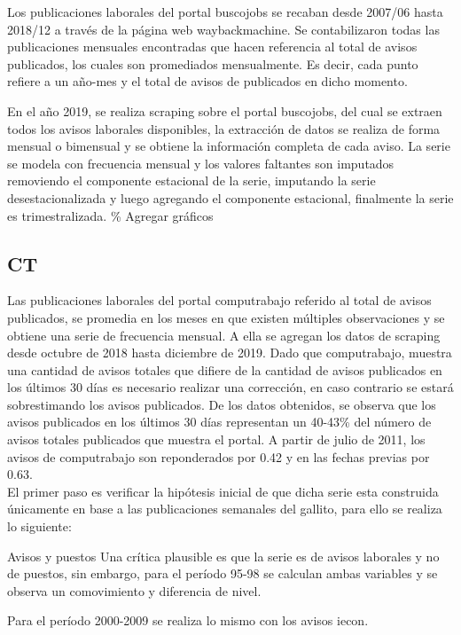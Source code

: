 \documentclass[12pt,twoside]{reedthesis}
\begin{document}
Los publicaciones laborales del portal buscojobs se recaban desde 2007/06 hasta 2018/12 a través de la página web waybackmachine. Se contabilizaron todas las publicaciones mensuales encontradas que hacen referencia al total de avisos publicados, los cuales son promediados mensualmente. Es decir, cada punto refiere a un año-mes y el total de avisos de publicados en dicho momento.

En el año 2019, se realiza scraping sobre el portal buscojobs, del cual se extraen todos los avisos laborales disponibles, la extracción de datos se realiza de forma mensual o bimensual y se obtiene la información completa de cada aviso.
La serie se modela con frecuencia mensual y los valores faltantes son imputados removiendo el componente estacional de la serie, imputando la serie desestacionalizada y luego agregando el componente estacional, finalmente la serie es trimestralizada.
\% Agregar gráficos

\hypertarget{ct}{%
\subsection{CT}\label{ct}}

Las publicaciones laborales del portal computrabajo referido al total de avisos publicados, se promedia en los meses en que existen múltiples observaciones y se obtiene una serie de frecuencia mensual. A ella se agregan los datos de scraping desde octubre de 2018 hasta diciembre de 2019. Dado que computrabajo, muestra una cantidad de avisos totales que difiere de la cantidad de avisos publicados en los últimos 30 días es necesario realizar una corrección, en caso contrario se estará sobrestimando los avisos publicados. De los datos obtenidos, se observa que los avisos publicados en los últimos 30 días representan un 40-43\% del número de avisos totales publicados que muestra el portal. A partir de julio de 2011, los avisos de computrabajo son reponderados por 0.42 y en las fechas previas por 0.63.\\

El primer paso es verificar la hipótesis inicial de que dicha serie esta construida únicamente en base a las publicaciones semanales del gallito, para ello se realiza lo siguiente:

Avisos y puestos
Una crítica plausible es que la serie es de avisos laborales y no de puestos, sin embargo, para el período 95-98 se calculan ambas variables y se observa un comovimiento y diferencia de nivel.

Para el período 2000-2009 se realiza lo mismo con los avisos iecon.
\end{document}
